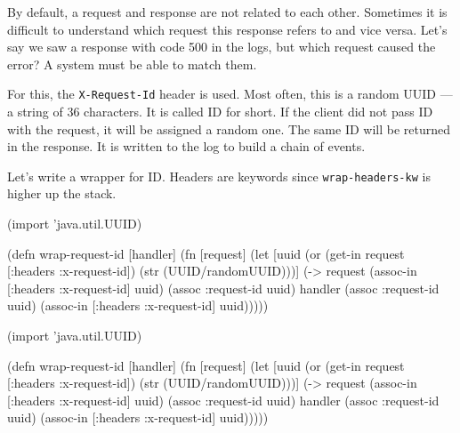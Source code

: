 By default, a request and response are not related to each other. Sometimes it is difficult to understand which request this response refers to and vice versa. Let's say we saw a response with code 500 in the logs, but which request caused the error? A system must be able to match them.

For this, the \verb|X-Request-Id| header is used. Most often, this is a random UUID — a string of 36 characters. It is called ID for short. If the client did not pass ID with the request, it will be assigned a random one. The same ID will be returned in the response. It is written to the log to build a chain of events.


Let's write a wrapper for ID. Headers are keywords since \verb|wrap-headers-kw| is higher up the stack.

\ifx\DEVICETYPE\MOBILE

\begin{english}
  \begin{clojure}
(import 'java.util.UUID)

(defn wrap-request-id [handler]
  (fn [request]
    (let [uuid (or
                (get-in request
                        [:headers
                         :x-request-id])
                (str
                  (UUID/randomUUID)))]
      (-> request
          (assoc-in [:headers
                     :x-request-id] uuid)
          (assoc :request-id uuid)
          handler
          (assoc :request-id uuid)
          (assoc-in [:headers
                     :x-request-id]
                    uuid)))))
  \end{clojure}
\end{english}

\else

\begin{english}
  \begin{clojure}
(import 'java.util.UUID)

(defn wrap-request-id [handler]
  (fn [request]
    (let [uuid (or (get-in request [:headers :x-request-id])
                   (str (UUID/randomUUID)))]
      (-> request
          (assoc-in [:headers :x-request-id] uuid)
          (assoc :request-id uuid)
          handler
          (assoc :request-id uuid)
          (assoc-in [:headers :x-request-id] uuid)))))
  \end{clojure}
\end{english}

\fi

